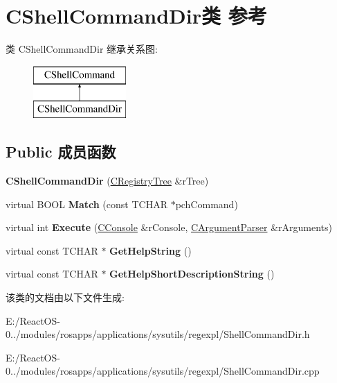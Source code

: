 \hypertarget{class_c_shell_command_dir}{}\section{C\+Shell\+Command\+Dir类 参考}
\label{class_c_shell_command_dir}
类 C\+Shell\+Command\+Dir 继承关系图\+:\begin{figure}[H]
\begin{center}
\leavevmode
\includegraphics[height=2.000000cm]{class_c_shell_command_dir}
\end{center}
\end{figure}
\subsection*{Public 成员函数}
\begin{DoxyCompactItemize}
\item 
\mbox{\label{class_c_shell_command_dir_a61b9ff221a93a3f2b32609514eb6bb95}} 
{\bfseries C\+Shell\+Command\+Dir} (\hyperlink{class_c_registry_tree}{C\+Registry\+Tree} \&r\+Tree)
\item 
\mbox{\label{class_c_shell_command_dir_a15dcbae8a1d0487ba99050c3f77ff12e}} 
virtual B\+O\+OL {\bfseries Match} (const T\+C\+H\+AR $\ast$pch\+Command)
\item 
\mbox{\label{class_c_shell_command_dir_a0fbc1922e75e838dadf3eb103c09de25}} 
virtual int {\bfseries Execute} (\hyperlink{class_c_console}{C\+Console} \&r\+Console, \hyperlink{class_c_argument_parser}{C\+Argument\+Parser} \&r\+Arguments)
\item 
\mbox{\label{class_c_shell_command_dir_ae769715d1994fade85f8773254a24945}} 
virtual const T\+C\+H\+AR $\ast$ {\bfseries Get\+Help\+String} ()
\item 
\mbox{\label{class_c_shell_command_dir_aa6262b75f3197b9a871b89bca01de606}} 
virtual const T\+C\+H\+AR $\ast$ {\bfseries Get\+Help\+Short\+Description\+String} ()
\end{DoxyCompactItemize}


该类的文档由以下文件生成\+:\begin{DoxyCompactItemize}
\item 
E\+:/\+React\+O\+S-\/0../modules/rosapps/applications/sysutils/regexpl/Shell\+Command\+Dir.\+h\item 
E\+:/\+React\+O\+S-\/0../modules/rosapps/applications/sysutils/regexpl/Shell\+Command\+Dir.\+cpp\end{DoxyCompactItemize}
